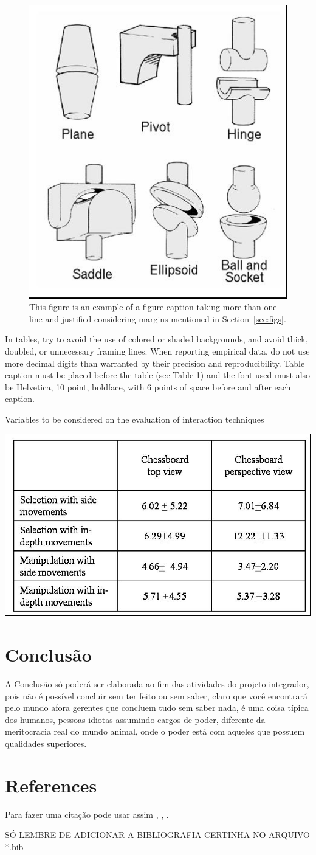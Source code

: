\documentclass[12pt]{article}
\begin{document}
\begin{figure}[ht]
\centering
\includegraphics[width=.3\textwidth]{fig2.jpg}
\caption{This figure is an example of a figure caption taking more than one
  line and justified considering margins mentioned in Section~\ref{sec:figs}.}
\label{fig:exampleFig2}
\end{figure}

In tables, try to avoid the use of colored or shaded backgrounds, and avoid
thick, doubled, or unnecessary framing lines. When reporting empirical data,
do not use more decimal digits than warranted by their precision and
reproducibility. Table caption must be placed before the table (see Table 1)
and the font used must also be Helvetica, 10 point, boldface, with 6 points of
space before and after each caption.

\begin{table}[ht]
\centering
\caption{Variables to be considered on the evaluation of interaction
  techniques}
\label{tab:exTable1}
\includegraphics[width=.7\textwidth]{table.jpg}
\end{table}

\section{Conclusão}

A Conclusão só poderá ser elaborada ao fim das atividades do projeto integrador, pois não é possível concluir sem ter feito ou sem saber, claro que você encontrará pelo mundo afora gerentes que concluem tudo sem saber nada, é uma coisa típica dos humanos, pessoas idiotas assumindo cargos de poder, diferente da meritocracia real do mundo animal, onde o poder está com aqueles que possuem qualidades superiores.

\section{References}

Para fazer uma citação pode usar assim \cite{barbosa:97},
\cite{boulic:91}, \cite{barbosa:97}.

SÓ LEMBRE DE ADICIONAR A BIBLIOGRAFIA CERTINHA NO ARQUIVO *.bib



\end{document}
